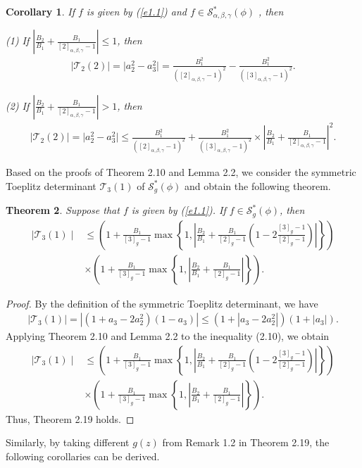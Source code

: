 \documentclass[11pt,twoside, reqno]{article}
\newtheorem{theorem}{Theorem}[section]
\newtheorem{corollary}[theorem]{Corollary}
\theoremstyle{definition}
\begin{document}
\begin{corollary}
If $f$ is given by (\ref{e1.1}) and $f\in\mathcal{S}^{\ast }_{\alpha, \beta, \gamma}(\phi)$ , then

(1) If $|\frac{B_{2}}{B_{1}}+\frac{B_{1}}{[2]_{\alpha, \beta, \gamma}-1}|\leq1$, then
\begin{align}\nonumber
\mid \mathcal{T}_2(2)\mid=\mid a_{2}^2-a_{3}^{2}\mid=
\frac{B_{1}^{2}}{([2]_{\alpha, \beta, \gamma}-1)^{2}}-\frac{B_{1}^{2}}{([3]_{\alpha, \beta, \gamma}-1)^{2}}.
\end{align}

(2) If $|\frac{B_{2}}{B_{1}}+\frac{B_{1}}{[2]_{\alpha, \beta, \gamma}-1}|>1$, then
\begin{align}\nonumber
\mid \mathcal{T}_2(2)\mid=\mid a_{2}^2-a_{3}^{2}\mid\leq
\frac{B_{1}^{2}}{([2]_{\alpha, \beta, \gamma}-1)^{2}}+\frac{B_{1}^{2}}{([3]_{\alpha, \beta, \gamma}-1)^{2}}
\times\left|\frac{B_{2}}{B_{1}}+\frac{B_{1}}{[2]_{\alpha, \beta, \gamma}-1}\right|^{2}.
\end{align}
\end{corollary}
Based on the proofs of Theorem 2.10 and Lemma 2.2, we consider the symmetric Toeplitz determinant $\mathcal{T}_3(1)$ of $\mathcal{S}^{\ast }_{g}(\phi)$ and obtain the following theorem.
\begin{theorem}
Suppose that $f$ is given by (\ref{e1.1}).  If $f\in\mathcal{S}^{\ast }_{g}(\phi)$, then
\begin{align}\nonumber
\mid \mathcal{T}_3(1)\mid &\leq \left(1+\frac{B_{1}}{[3]_{g}-1}\max\left\{1,\left|\frac{B_{2}}{B_{1}}+
\frac{B_{1}}{[2]_{g}-1}\left(1-2\frac{[3]_{g}-1}{[2]_{g}-1}\right)\right|\right\}\right)\\\nonumber
&\times\left(1+\frac{B_{1}}{[3]_{g}-1}\max\left\{1, \left|\frac{B_{2}}{B_{1}}+\frac{B_{1}}{[2]_{g}-1}\right|\right\}\right).
\end{align}
\end{theorem}
\begin{proof}
By the definition of the symmetric Toeplitz determinant, we have
\begin{align}
\mid \mathcal{T}_3(1)\mid=|(1+a_{3}-2a_{2}^2)(1-a_{3})|\le (1+|a_{3}-2a_{2}^2|)(1+|a_{3}|).
\end{align}
Applying Theorem 2.10 and Lemma 2.2 to the inequality (2.10), we obtain
\begin{align}\nonumber
\mid \mathcal{T}_3(1)\mid &\leq \left(1+\frac{B_{1}}{[3]_{g}-1}\max\left\{1,\left|\frac{B_{2}}{B_{1}}+
\frac{B_{1}}{[2]_{g}-1}\left(1-2\frac{[3]_{g}-1}{[2]_{g}-1}\right)\right|\right\}\right)\\\nonumber
&\times\left(1+\frac{B_{1}}{[3]_{g}-1}\max\left\{1, \left|\frac{B_{2}}{B_{1}}+\frac{B_{1}}{[2]_{g}-1}\right|\right\}\right).
\end{align}
Thus, Theorem 2.19 holds.
\end{proof}
Similarly, by taking different $g(z)$ from Remark 1.2 in Theorem 2.19, the following corollaries can be derived.
\end{document}
